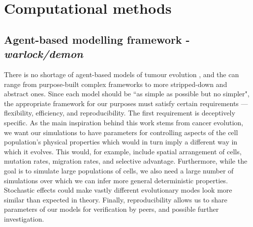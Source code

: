 \section{Computational methods}
\subsection{Agent-based modelling framework - \textit{warlock/demon}}
There is no shortage of agent-based models of tumour evolution \cite{colyer_seven-step_2023}, and the can range from purpose-built complex frameworks to more stripped-down and abstract ones. Since each model should be ``as simple as possible but no simpler", the appropriate framework for our purposes must satisfy certain requirements --- flexibility, efficiency, and reproducibility. The first requirement is deceptively specific. As the main inspiration behind this work stems from cancer evolution, we want our simulations to have parameters for controlling aspects of the cell population's physical properties which would in turn imply a different way in which it evolves. This would, for example, include spatial arrangement of cells, mutation rates, migration rates, and selective advantage. Furthermore, while the goal is to simulate large populations of cells, we also need a large number of simulations over which we can infer more general deterministic properties. Stochastic effects could make vastly different evolutionary modes look more similar than expected in theory. Finally, reproducibility allows us to share parameters of our models for verification by peers, and possible further investigation.\\
